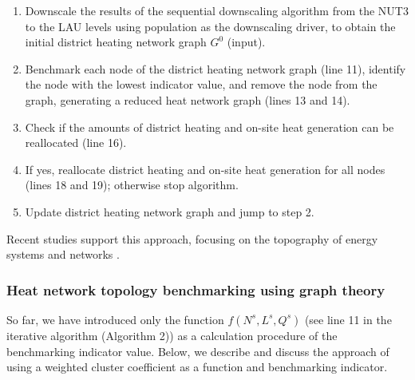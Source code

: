 \begin{enumerate}[nolistsep]
	\item Downscale the results of the sequential downscaling algorithm from the NUT3 to the LAU levels using population as the downscaling driver, to obtain the initial district heating network graph $G^{0}$ (input).
	\item Benchmark each node of the district heating network graph (line 11), identify the node with the lowest indicator value, and remove the node from the graph, generating a reduced heat network graph (lines 13 and 14).
	\item Check if the amounts of district heating and on-site heat generation can be reallocated (line 16).
	\item If yes, reallocate district heating and on-site heat generation for all nodes (lines 18 and 19); otherwise stop algorithm.
	\item Update district heating network graph and jump to step 2.
\end{enumerate}
\vspace{0.5cm}

Recent studies support this approach, focusing on the topography of energy systems and networks . 

\subsubsection{Heat network topology benchmarking using graph theory}\label{bench}
So far, we have introduced only the function $f(N^{s}, L^{s}, Q^{s})$ (see line 11 in the iterative algorithm (Algorithm 2)) as a calculation procedure of the benchmarking indicator value. Below, we describe and discuss the approach of using a weighted cluster coefficient as a function and benchmarking indicator.\vspace{0.3cm}

